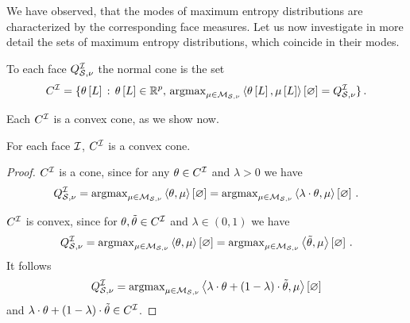 
We have observed, that the modes of maximum entropy distributions are characterized by the corresponding face measures.
Let us now investigate in more detail the sets of maximum entropy distributions, which coincide in their modes.

\begin{definition}
    To each face $Q^{\mathcal{I}}_{\mathcal{S},\nu}$ the normal cone is the set %
    \begin{align*}
        C^{\mathcal{I}} = \{\theta\left[L\right]\,:\,\theta\left[L\right]\in\mathbb{R}^{p},\,\mathrm{argmax}_{\mu\in\mathcal{M}_{\mathcal{S},\nu}}\left\langle \theta\left[L\right],\mu\left[L\right]\right\rangle \left[ \varnothing \right]=Q^{\mathcal{I}}_{\mathcal{S},\nu}\} \, .
    \end{align*}
\end{definition}

Each $C^{\mathcal{I}}$ is a convex cone, as we show now.


\begin{lemma}
    For each face $\mathcal{I}$, $C^{\mathcal{I}}$ is a convex cone. %
\end{lemma}
\begin{proof}
    $C^{\mathcal{I}}$ is a cone, since for any $\theta\in C^{\mathcal{I}}$ and $\lambda>0$ we have
    \begin{align*}
        Q^{\mathcal{I}}_{\mathcal{S},\nu} = \mathrm{argmax}_{\mu\in\mathcal{M}_{\mathcal{S},\nu}} \left\langle \theta,\mu\right\rangle \left[ \varnothing \right] = \mathrm{argmax}_{\mu\in\mathcal{M}_{\mathcal{S},\nu}} \left\langle \lambda\cdot\theta,\mu\right\rangle \left[ \varnothing \right] \, .
    \end{align*}

    $C^{\mathcal{I}}$ is convex, since for $\theta,\tilde{\theta}\in C^{\mathcal{I}}$ and $\lambda\in(0,1)$ we have
    \begin{align*}
        Q^{\mathcal{I}}_{\mathcal{S},\nu} = \mathrm{argmax}_{\mu\in\mathcal{M}_{\mathcal{S},\nu}} \left\langle \theta,\mu\right\rangle \left[ \varnothing \right] = \mathrm{argmax}_{\mu\in\mathcal{M}_{\mathcal{S},\nu}} \left\langle \tilde{\theta},\mu\right\rangle \left[ \varnothing \right] \, .
    \end{align*}
    It follows
    \begin{align*}
        Q^{\mathcal{I}}_{\mathcal{S},\nu} = \mathrm{argmax}_{\mu\in\mathcal{M}_{\mathcal{S},\nu}} \left\langle \lambda\cdot\theta+(1-\lambda)\cdot\tilde{\theta},\mu\right\rangle \left[ \varnothing \right]
    \end{align*}
    and $\lambda\cdot\theta+(1-\lambda)\cdot\tilde{\theta} \in C^{\mathcal{I}}$.
\end{proof}

